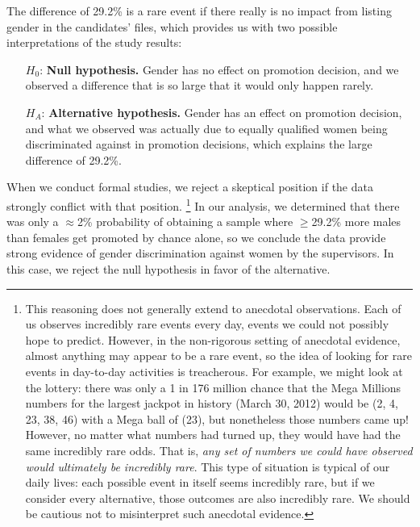 The difference of 29.2\% is a rare event if there really is no impact from listing gender in the candidates' files, which provides us with two possible interpretations of the study results:
\begin{itemize}
\setlength{\itemsep}{0mm}
\item[$H_0$:] \textbf{Null hypothesis.} Gender has no effect on promotion decision, and we observed a difference that is so large that it would only happen rarely.
\item[$H_A$:] \textbf{Alternative hypothesis.} Gender has an effect on promotion decision, and what we observed was actually due to equally qualified women being discriminated against in promotion decisions, which explains the large difference of 29.2\%.
\end{itemize}
When we conduct formal studies, we reject a skeptical position if the data strongly conflict with that position.%
\footnote{This reasoning does not generally extend to anecdotal observations. Each of us observes incredibly rare events every day, events we could not possibly hope to predict. However, in the non-rigorous setting of anecdotal evidence, almost anything may appear to be a rare event, so the idea of looking for rare events in day-to-day activities is treacherous. For example, we might look at the lottery: there was only a 1 in 176 million chance that the Mega Millions numbers for the largest jackpot in history (March 30, 2012) would be (2, 4, 23, 38, 46) with a Mega ball of (23), but nonetheless those numbers came up! However, no matter what numbers had turned up, they would have had the same incredibly rare odds. That is, \emph{any set of numbers we could have observed would ultimately be incredibly rare}. This type of situation is typical of our daily lives: each possible event in itself seems incredibly rare, but if we consider every alternative, those outcomes are also incredibly rare. We should be cautious not to misinterpret such anecdotal evidence.} 
In our analysis, we determined that there was only a $\approx$2\% probability of obtaining a sample where $\geq$29.2\% more males than females get promoted by chance alone, so we conclude the data provide strong evidence of gender discrimination against women by the supervisors. In this case, we reject the null hypothesis in favor of the alternative.


